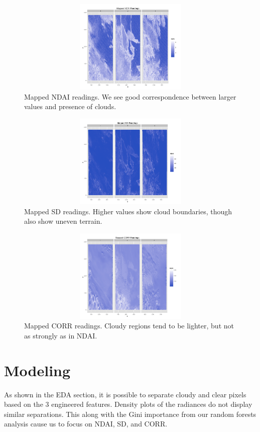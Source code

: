 \documentclass{article}\usepackage[]{graphicx}\usepackage[]{color}
\begin{document}
\begin{figure}[H]
\includegraphics[width = 18cm, height = 4.5cm]{NDAIEDA.png}
\caption{Mapped NDAI readings. We see good correspondence between larger values and presence of clouds.}
\end{figure}

\begin{figure}[H]
\includegraphics[width = 18cm, height = 4.5cm]{SDEDA.png}
\caption{Mapped SD readings. Higher values show cloud boundaries, though also show uneven terrain.}
\end{figure}

\begin{figure}[H]
\includegraphics[width = 18cm, height = 4.5cm]{CORREDA.png}
\caption{Mapped CORR readings. Cloudy regions tend to be lighter, but not as strongly as in NDAI.}
\end{figure}

\section{Modeling} As shown in the EDA section, it is possible to separate cloudy and clear pixels based on the 3 engineered features. Density plots of the radiances do not display similar separations. This along with the Gini importance from our random forests analysis cause us to focus on NDAI, SD, and CORR.
\end{document}
